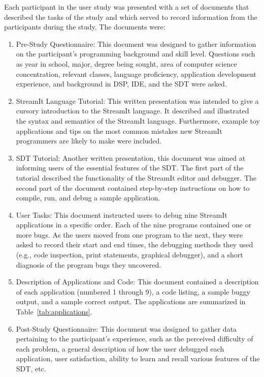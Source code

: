 \documentclass[times, 10pt,twocolumn]{article}
\begin{document}
Each participant in the user study was presented with a  set of
documents that described the tasks of the study and which served to
record information from the participants during the study. The
documents were:
\begin{enumerate}
\item Pre-Study  Questionnaire: This  document was designed  to gather
information  on  the participant's  programming  background and  skill
level. Questions such  as year in school, major,  degree being sought,
area  of computer  science concentration,  relevant  classes, language
proficiency,  application development  experience,  and background  in
DSP, IDE, and the SDT were asked.
\item  StreamIt  Language  Tutorial:  This  written  presentation  was
intended to give  a cursory introduction to the  StreamIt language. It
described  and illustrated the  syntax and  semantics of  the StreamIt
language. Furthermore,  example toy applications and tips  on the most
common  mistakes new  StreamIt  programmers are  likely  to make  were
included.
\item SDT  Tutorial: Another  written presentation, this  document was
aimed at  informing users  of the essential  features of the  SDT. The
first part of the tutorial described the functionality of the StreamIt
editor  and  debugger.  The  second  part of  the  document  contained
step-by-step instructions on  how to compile, run, and  debug a sample
application.
\item  User  Tasks:  This  document  instructed users  to  debug  nine
StreamIt applications in  a specific order. Each of  the nine programs
contained one  or more bugs.  As  the users moved from  one program to
the next,  they were asked  to record their  start and end  times, the
debugging methods they used  (e.g., code inspection, print statements,
graphical debugger),  and a short  diagnosis of the program  bugs they
uncovered.
\item Description of Applications  and Code: This document contained a
description  of  each  application  (numbered  1 through  9),  a  code
listing, a sample buggy output, and a sample correct output. The
applications are summarized in Table~\ref{tab:applications}.
\item Post-Study  Questionnaire: This document was  designed to gather
data pertaining to the participant's experience, such as the perceived
difficulty  of each  problem, a  general description  of how  the user
debugged  each application,  user satisfaction,  ability to  learn and
recall various features of the SDT, etc.
\end{enumerate}
\end{document}
